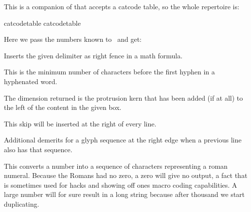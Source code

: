 \stopnewprimitive

\startnewprimitive[title={\prm {retokenized}}]

This is a companion of  that accepts a catcode table, so the
whole repertoire is:

\startbuffer
{}
\tokenized   catcodetable 
\tokenized   catcodetable 
\retokenized              {}
\retokenized              {}
\stopbuffer

\typebuffer

Here we pass the numbers known to \CONTEXT\ and get:

\startlines
\getbuffer
\stoplines

\stopnewprimitive

\startoldprimitive[title={\prm {right}}]

Inserts the given delimiter as right fence in a math formula.

\stopoldprimitive

\startoldprimitive[title={\prm {righthyphenmin}}]

This is the minimum number of characters before the first hyphen in a hyphenated
word.

\stopoldprimitive

\startnewprimitive[title={\prm {rightmarginkern}}]

The dimension returned is the protrusion kern that has been added (if at all) to
the left of the content in the given box.

\stopnewprimitive

\startoldprimitive[title={\prm {rightskip}}]

This skip will be inserted at the right of every line.

\stopoldprimitive

\startnewprimitive[title={\prm {righttwindemerits}}]

Additional demerits for a glyph sequence at the right edge when a previous line
also has that sequence.

\stopnewprimitive

\startoldprimitive[title={\prm {romannumeral}}]

This converts a number into a sequence of characters representing a roman
numeral. Because the Romans had no zero, a zero will give no output, a fact that
is sometimes used for hacks and showing off ones macro coding capabilities. A
large number will for sure result in a long string because after thousand we
start duplicating.

